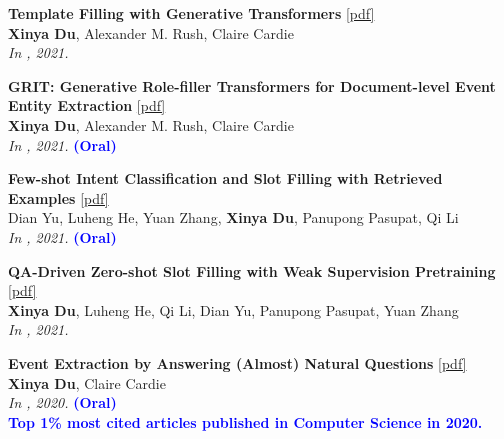 \begin{enumerate}[{[}1{]},resume,leftmargin=*]
\parbox{\linewidth}{
\item
{\bf Template Filling with Generative Transformers} 
\href{https://aclanthology.org/2021.naacl-main.70.pdf}{{[pdf]}} \\
{{\bf Xinya Du}, Alexander M. Rush, Claire Cardie} \\
{\it In \NAACL, 2021.} \\
}

\parbox{\linewidth}{
\item
{\bf GRIT: Generative Role-filler Transformers for Document-level Event Entity Extraction}
\href{https://aclanthology.org/2021.eacl-main.52.pdf}{{[pdf]}} \\
{\textbf{Xinya Du}, Alexander M. Rush, Claire Cardie} \\
{\it In \EACL, 2021.} {\textcolor{blue}{\textbf{(Oral)}}} \\

}

\parbox{\linewidth}{
\item
{\bf Few-shot Intent Classification and Slot Filling with Retrieved Examples}
\href{https://aclanthology.org/2021.naacl-main.59.pdf}{{[pdf]}} \\
{Dian Yu, Luheng He, Yuan Zhang, \textbf{Xinya Du}, Panupong Pasupat, Qi Li} \\
{\it In \NAACL, 2021.} {\textcolor{blue}{\textbf{(Oral)}}} \\ 
}

\parbox{\linewidth}{
\item
{\bf QA-Driven Zero-shot Slot Filling with Weak Supervision Pretraining}
\href{https://aclanthology.org/2021.acl-short.83.pdf}{{[pdf]}} \\
{{\bf Xinya Du}, Luheng He, Qi Li, Dian Yu, Panupong Pasupat, Yuan Zhang} \\
{\it In \ACL, 2021.}\\
}

\parbox{\linewidth}{
\item\label{pub:eeqa}
{\bf Event Extraction by Answering (Almost) Natural Questions}
\href{https://aclanthology.org/2020.emnlp-main.49.pdf}{{[pdf]}} \\
{\textbf{Xinya Du}, Claire Cardie} \\
{\it In \EMNLP, 2020.} {\textcolor{blue}{\textbf{(Oral)}}} \\
{\textcolor{blue}{\textbf{Top 1\% most cited articles published in Computer Science in 2020.}}} \\
}


\end{enumerate}
